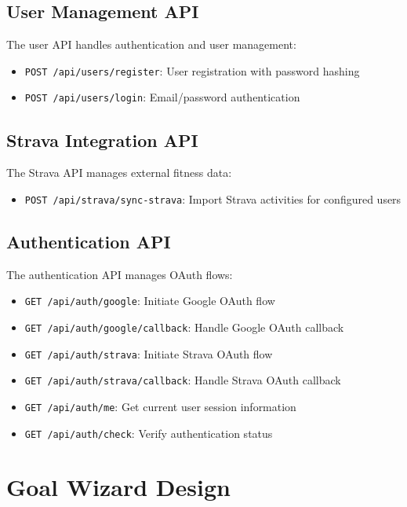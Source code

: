 \subsection{User Management API}

The user API handles authentication and user management:

\begin{itemize}
    \item \texttt{POST /api/users/register}: User registration with password hashing
    \item \texttt{POST /api/users/login}: Email/password authentication
\end{itemize}

\subsection{Strava Integration API}

The Strava API manages external fitness data:

\begin{itemize}
    \item \texttt{POST /api/strava/sync-strava}: Import Strava activities for configured users
\end{itemize}

\subsection{Authentication API}

The authentication API manages OAuth flows:

\begin{itemize}
    \item \texttt{GET /api/auth/google}: Initiate Google OAuth flow
    \item \texttt{GET /api/auth/google/callback}: Handle Google OAuth callback
    \item \texttt{GET /api/auth/strava}: Initiate Strava OAuth flow
    \item \texttt{GET /api/auth/strava/callback}: Handle Strava OAuth callback
    \item \texttt{GET /api/auth/me}: Get current user session information
    \item \texttt{GET /api/auth/check}: Verify authentication status
\end{itemize}

\section{Goal Wizard Design}

